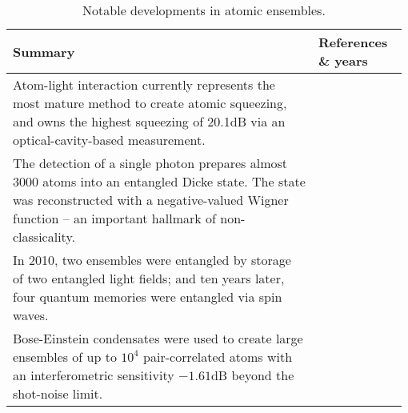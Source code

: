 \begin{table*}[!htbp]
	\begin{tabular}{|p{0.755\linewidth}|p{0.22\linewidth}|}
		\hline
	\textbf{Summary} & \textbf{References \& years} \\	\hline \hline
		Atom-light interaction currently represents the most mature method to create atomic squeezing, and owns the highest squeezing of 20.1dB via an optical-cavity-based measurement. & \cite{bib:hosten2016measurement} \\
		\hline
		The detection of a single photon prepares almost 3000 atoms into an entangled Dicke state\index{Dicke state}. The state was reconstructed with a negative-valued Wigner function\index{Wigner function} -- an important hallmark of non-classicality. &  \cite{bib:mcconnell2015entanglement} \\
		\hline
		In 2010, two ensembles were entangled by storage of two entangled light fields; and ten years later, four quantum memories were entangled via spin waves. & \cite{bib:lukin2000entanglement, bib:choi2010entanglement} \\
		\hline
		Bose-Einstein condensates were used to create large ensembles of up to ${10^4}$ pair-correlated atoms with an interferometric sensitivity $-1.61$dB beyond the shot-noise limit. & \cite{bib:lucke2011twin} \\
		\hline
	\end{tabular}
	\captionspacetab \caption{Notable developments in atomic ensembles.} \label{tab:atomic_ensembles}
\end{table*}

